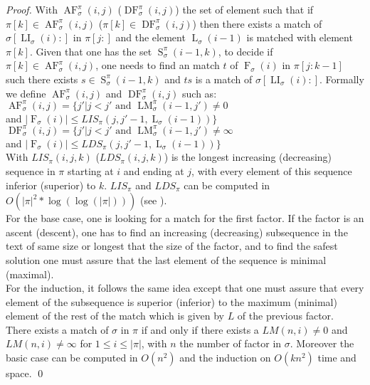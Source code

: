 \documentclass[a4paper]{llncs}
\newcommand{\ptext}{\pi}
\newcommand{\pmotif}{\sigma}
\newcounter{num}
\DeclareMathOperator{\firsta}{L}
\newcommand{\first}[2]{\firsta_{{#1}}({#2})}
\DeclareMathOperator{\firstia}{LI}
\newcommand{\firsti}[2]{\firstia_{{#1}}({#2})}
\DeclareMathOperator{\factora}{F}
\newcommand{\factor}[2]{\factora_{{#1}}({#2})}
\DeclareMathOperator{\LMa}{LM}
\newcommand{\LM}[4]{\LMa_{{#1}}^{{#2}}(#3,#4)}
\DeclareMathOperator{\AFa}{AF}
\newcommand{\AF}[4]{\AFa_{{#1}}^{{#2}}(#3,#4)}
\DeclareMathOperator{\DFa}{DF}
\newcommand{\DF}[4]{\DFa_{{#1}}^{{#2}}(#3,#4)}
\DeclareMathOperator{\SETa}{S}
\newcommand{\SET}[4]{\SETa_{{#1}}^{{#2}}({#3},{#4})}
\begin{document}
\begin{proof}
With $\AF{\pmotif}{\ptext}{i}{j}$ ($\DF{\pmotif}{\ptext}{i}{j}$) the set of element such that if  $\ptext[k] \in \AF{\pmotif}{\ptext}{i}{j}$ ($\ptext[k] \in \DF{\pmotif}{\ptext}{i}{j}$) then there exists a match of $\pmotif[\firsti{\pmotif}{i}:]$ in $\ptext[j:]$ and the element $\first{\pmotif}{i-1}$ is matched with element $\ptext[k]$. Given that one has the set $\SET{\pmotif}{\ptext}{i-1}{k}$, to decide if $\ptext[k] \in \AF{\pmotif}{\ptext}{i}{j}$, one needs to find an match $t$ of $\factor{\pmotif}{i}$ in $\ptext[j:k-1]$ such there exists $s \in \SET{\pmotif}{\ptext}{i-1}{k}$ and $ts$ is a match of $\pmotif[\firsti{\pmotif}{i}:]$.
Formally we define $\AF{\pmotif}{\ptext}{i}{j}$ and $\DF{\pmotif}{\ptext}{i}{j}$ such as:\\



$\AF{\pmotif}{\ptext}{i}{j}=\{j'|\text{$j<j'$ and $\LM{\pmotif}{\ptext}{i-1}{j'} \neq 0$}$ \\
\indent \indent \indent and  $|\factor{\pmotif}{i}| \leq LIS_{\ptext}(j,j'-1,\first{\pmotif}{i-1})\}$ \\

$\DF{\pmotif}{\ptext}{i}{j}=\{j'|\text{$j<j'$ and $\LM{\pmotif}{\ptext}{i-1}{j'} \neq \infty$}$ \\
\indent \indent \indent and  $|\factor{\pmotif}{i}| \leq LDS_{\ptext}(j,j'-1,\first{\pmotif}{i-1}) \}$ \\

With $LIS_{\ptext}(i,j,k)$ ($LDS_{\ptext}(i,j,k)$) is the longest increasing (decreasing) sequence in $\ptext$ starting at $i$ and ending at $j$,
with every element of this sequence
inferior (superior) to $k$.
$LIS_{\ptext}$ and $LDS_{\ptext}$ can be computed in $O(|\ptext|^2*\log(\log(|\ptext|)))$ (see \cite{Bespamyatnikh00enumeratinglongest}).\\

For the base case,
one is looking for a match for the first factor.
If the factor is an ascent (descent),
one has to find an increasing (decreasing) subsequence
in the text of same size or longest that
the size of the factor,
and to find the safest solution
one must assure that the last element
of the sequence is minimal (maximal).\\
For the induction, it follows the same idea
except that one must assure that
every element of the subsequence is superior (inferior)
to the maximum (minimal) element of the rest of the match which is given by $L$ of
the previous factor.\\

There exists a match of $\pmotif$ in $\ptext$ if and only if
there exists a $LM(n,i)\neq 0$ and $LM(n,i)\neq \infty$ for $1 \leq i \leq |\ptext|$,
with $n$ the number of factor in $\pmotif$.
Moreover the basic case can be computed in $O(n^2)$
and the induction on $O(kn^2)$ time and space.
\qed
\end{proof}
\end{document}
